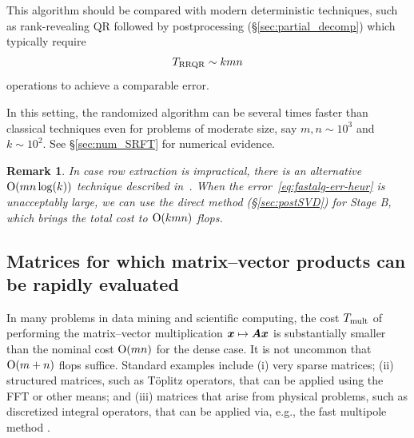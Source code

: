 \documentclass[final]{siamltex}
\newcounter{algorithm}[section]
\newcommand{\pgnotate}[1]{{\color{blue}[#1]}}
\newtheorem{remark}{Remark}[section]
\begin{document}
This algorithm should be compared with modern deterministic techniques,
such as rank-revealing QR followed by postprocessing (\S\ref{sec:partial_decomp})
which typically require
$$
T_{\rm RRQR} \sim kmn
$$
operations to achieve a comparable error.

In this setting, the randomized algorithm can be several times faster than classical
techniques even for problems of moderate size, say $m, n \sim 10^3$ and $k \sim 10^2$.
See \S\ref{sec:num_SRFT} for numerical evidence.

\lsp

\begin{remark} \rm
In case row extraction is impractical, there is an alternative
$\mathrm{O}(mn\log(k))$ technique described in~\cite[\S5.2]{random2}.
When the error~\eqref{eq:fastalg-err-heur} is unacceptably large,
we can use the direct method (\S\ref{sec:postSVD}) for Stage B,
which brings the total cost to $\mathrm{O}( kmn )$ flops.
\end{remark}

\subsection{Matrices for which matrix--vector products can be rapidly evaluated}
\label{sec:fastmatvec}

In many problems in data mining and scientific computing, the cost
$T_{\rm mult}$ of performing the matrix--vector multiplication
$\bm{x} \mapsto \bm{A}\bm{x}$ is substantially smaller
than the nominal cost $\mathrm{O}(mn)$ for the dense case.
It is not uncommon that $\mathrm{O}(m + n)$ flops suffice.
Standard examples include (i) very sparse matrices;
(ii) structured matrices, such as T{\"o}plitz operators, that can be applied
using the FFT or other means; and
(iii) matrices that arise from physical problems, such as
discretized integral operators, that can be applied via, e.g.,
the fast multipole method \cite{rokhlin1997}.
\end{document}
